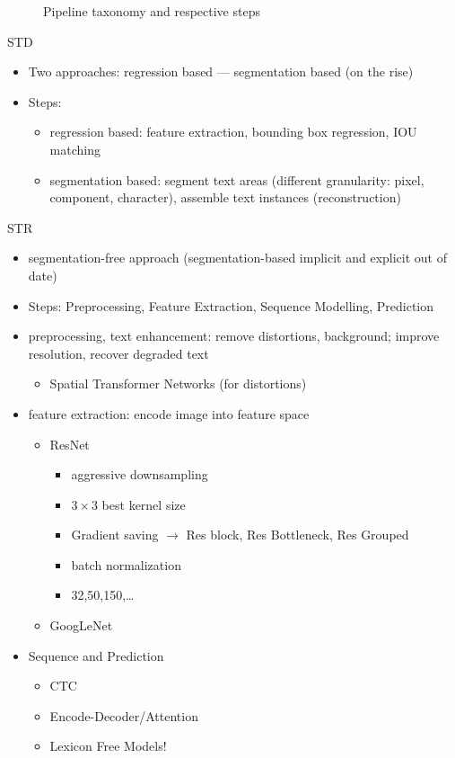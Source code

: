 \begin{figure}[ht]
    \centering
    
\caption{Pipeline taxonomy and respective steps\label{fig:pipelineSteps}}
\end{figure}

STD
\begin{itemize}
    \item Two approaches: regression based --- segmentation based (on the rise)
    \item Steps:
        \begin{itemize}
            \item regression based: feature extraction, bounding box regression, IOU matching
            \item segmentation based: segment text areas (different granularity: pixel, component,
                character), assemble text instances (reconstruction)
        \end{itemize}
\end{itemize}

STR
\begin{itemize}
    \item segmentation-free approach (segmentation-based implicit and explicit out of date)
    \item Steps: Preprocessing, Feature Extraction, Sequence Modelling, Prediction
    \item preprocessing, text enhancement: remove distortions, background; improve resolution,
        recover degraded text
        \begin{itemize}
            \item Spatial Transformer Networks (for distortions)
        \end{itemize}
    \item feature extraction: encode image into feature space
        \begin{itemize}
            \item ResNet
                \begin{itemize}
                    \item aggressive downsampling
                    \item $3\times3$ best kernel size
                    \item Gradient saving $\rightarrow$ Res block, Res Bottleneck, Res Grouped
                    \item batch normalization
                    \item 32,50,150,\ldots
                \end{itemize}
            \item GoogLeNet
        \end{itemize}
    \item Sequence and Prediction
        \begin{itemize}
            \item CTC
            \item Encode-Decoder/Attention
            \item Lexicon Free Models!
        \end{itemize}
\end{itemize}

